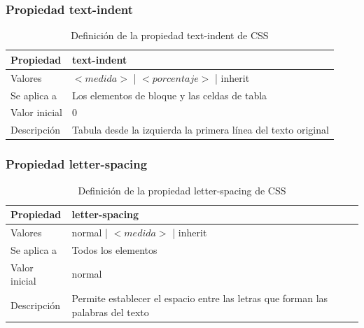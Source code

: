 \begin{frame}
\frametitle{Propiedad text-indent}

\begin{center}
  \begin{table}
   \begin{tabular}{p{1.8cm}p{7.8cm}}
Propiedad & \bf{text-indent} \\ \hline
Valores& $<medida>$ | $<porcentaje>$ | inherit \\ \hline
Se aplica a& Los elementos de bloque y las celdas de tabla \\ \hline
Valor inicial& 0 \\ \hline
Descripción& Tabula desde la izquierda la primera línea del texto original \\ \hline
  \end{tabular}
   \caption{Definición de la propiedad text-indent de CSS}
 \end{table}
\end{center}


\end{frame}



\begin{frame}
\frametitle{Propiedad letter-spacing}

\begin{center}
  \begin{table}
   \begin{tabular}{p{1.8cm}p{7.8cm}}
Propiedad & \bf{letter-spacing} \\ \hline
Valores& normal | $<medida>$ | inherit \\ \hline
Se aplica a& Todos los elementos \\ \hline
Valor inicial& normal \\ \hline
Descripción& Permite establecer el espacio entre las letras que forman las palabras del texto \\ \hline
  \end{tabular}
   \caption{Definición de la propiedad letter-spacing de CSS}
 \end{table}
\end{center}


\end{frame}



